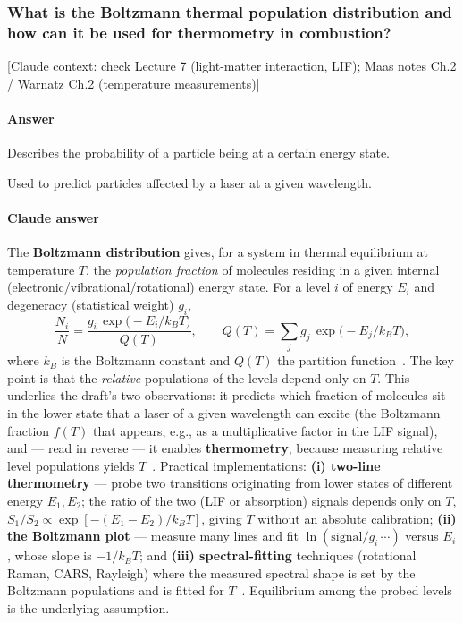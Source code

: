 \subsubsection{What is the Boltzmann thermal population distribution and how can it be used for thermometry in combustion?}

{\color{gray}\footnotesize [Claude context: check Lecture 7 (light-matter interaction, LIF); Maas notes Ch.2 / Warnatz Ch.2 (temperature measurements)]}

\paragraph{Answer} Describes the probability of a particle being at a certain energy state.

Used to predict particles affected by a laser at a given wavelength.

{\color{istblue}
\paragraph{Claude answer}
The \textbf{Boltzmann distribution} gives, for a system in thermal equilibrium at temperature $T$, the \emph{population fraction} of molecules residing in a given internal (electronic/vibrational/rotational) energy state. For a level $i$ of energy $E_i$ and degeneracy (statistical weight) $g_i$,
\begin{equation*}
\frac{N_i}{N} = \frac{g_i\, \exp\!\big(-E_i/k_B T\big)}{Q(T)}, \qquad Q(T) = \sum_j g_j\,\exp\!\big(-E_j/k_B T\big),
\end{equation*}
where $k_B$ is the Boltzmann constant and $Q(T)$ the partition function~\cite{lecture7,warnatz2006combustion}. The key point is that the \emph{relative} populations of the levels depend only on $T$. This underlies the draft's two observations: it predicts which fraction of molecules sit in the lower state that a laser of a given wavelength can excite (the Boltzmann fraction $f(T)$ that appears, e.g., as a multiplicative factor in the LIF signal), and --- read in reverse --- it enables \textbf{thermometry}, because measuring relative level populations yields $T$~\cite{lecture7,crosley1983}. Practical implementations: \textbf{(i) two-line thermometry} --- probe two transitions originating from lower states of different energy $E_1,E_2$; the ratio of the two (LIF or absorption) signals depends only on $T$, $S_1/S_2 \propto \exp[-(E_1-E_2)/k_B T]$, giving $T$ without an absolute calibration; \textbf{(ii) the Boltzmann plot} --- measure many lines and fit $\ln(\text{signal}/g_i\,\cdots)$ versus $E_i$, whose slope is $-1/k_B T$; and \textbf{(iii) spectral-fitting} techniques (rotational Raman, CARS, Rayleigh) where the measured spectral shape is set by the Boltzmann populations and is fitted for $T$~\cite{lecture7,warnatz2006combustion,glassman2014combustion}. Equilibrium among the probed levels is the underlying assumption.
}






